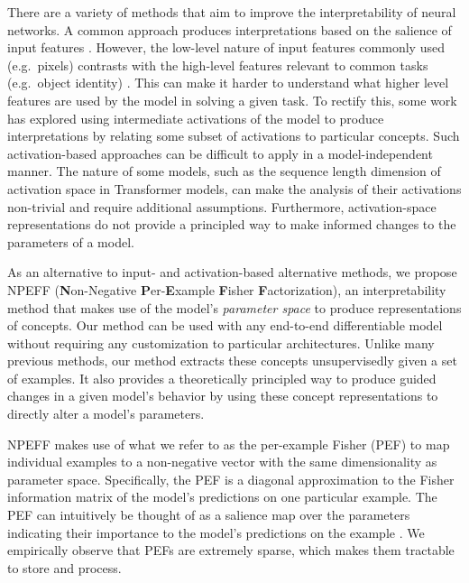 \documentclass[dvipsnames]{article}
\begin{document}
There are a variety of methods that aim to improve the interpretability of neural networks.
A common approach produces interpretations based on the salience of input features \citep{smilkov2017smoothgrad, dabkowski2017real, sundararajan2017axiomatic}.
However, the low-level nature of input features commonly used (e.g.\ pixels) contrasts with the high-level features relevant to common tasks (e.g.\ object identity) \citep{kim2018interpretability}.
This can make it harder to understand what higher level features are used by the model in solving a given task.
To rectify this, some work has explored using intermediate activations of the model to produce interpretations by relating some subset of activations to particular concepts. %
Such activation-based approaches can be difficult to apply in a model-independent manner.
The nature of some models, such as the sequence length dimension of activation space in Transformer models, can make the analysis of their activations non-trivial and require additional assumptions.
Furthermore, activation-space representations do not provide a principled way to make informed changes to the parameters of a model.

As an alternative to input- and activation-based alternative methods, we propose NPEFF (\textbf{N}on-Negative \textbf{P}er-\textbf{E}xample \textbf{F}isher \textbf{F}actorization), an interpretability method that makes use of the model's \textit{parameter space} to produce representations of concepts.
Our method can be used with any end-to-end differentiable model without requiring any customization to particular architectures.
Unlike many previous methods, our method extracts these concepts unsupervisedly given a set of examples.
It also provides a theoretically principled way to produce guided changes in a given model's behavior by using these concept representations to directly alter a model's parameters.

NPEFF makes use of what we refer to as the per-example Fisher (PEF) to map individual examples to a non-negative vector with the same dimensionality as parameter space.
Specifically, the PEF is a diagonal approximation to the Fisher information matrix \citep{fisher1922mathematical} of the model's predictions on one particular example.
The PEF can intuitively be thought of as a salience map over the parameters indicating their importance to the model's predictions on the example \citep{kirkpatrick2017overcoming}.
We empirically observe that PEFs are extremely sparse, which makes them tractable to store and process.
\end{document}
